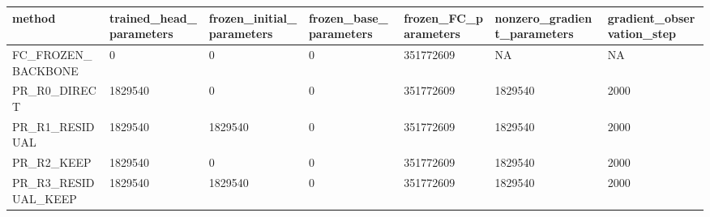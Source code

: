 \begin{tabular}{lllllll}
\toprule
method & trained\_head\_parameters & frozen\_initial\_parameters & frozen\_base\_parameters & frozen\_FC\_parameters & nonzero\_gradient\_parameters & gradient\_observation\_step \\
\midrule
FC\_FROZEN\_BACKBONE & 0 & 0 & 0 & 351772609 & NA & NA \\
PR\_R0\_DIRECT & 1829540 & 0 & 0 & 351772609 & 1829540 & 2000 \\
PR\_R1\_RESIDUAL & 1829540 & 1829540 & 0 & 351772609 & 1829540 & 2000 \\
PR\_R2\_KEEP & 1829540 & 0 & 0 & 351772609 & 1829540 & 2000 \\
PR\_R3\_RESIDUAL\_KEEP & 1829540 & 1829540 & 0 & 351772609 & 1829540 & 2000 \\
\bottomrule
\end{tabular}
